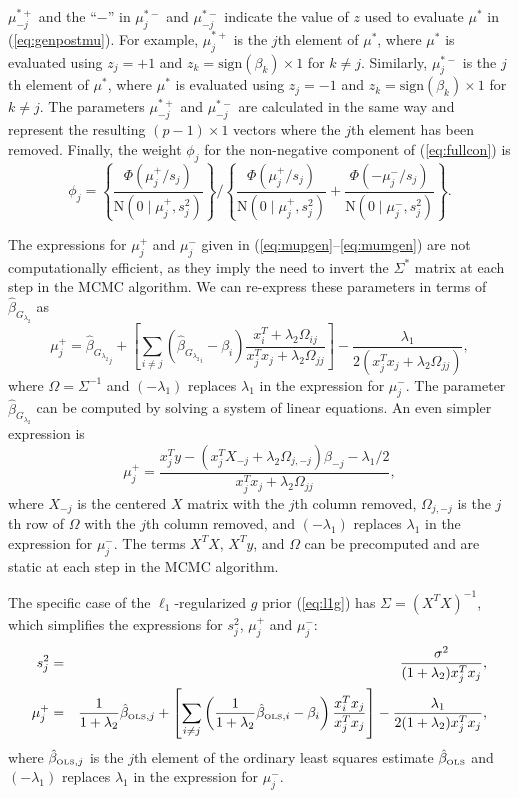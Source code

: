\documentclass[12pt]{article}
\begin{document}
$\mu^{*+}_{-j}$ and the ``$-$'' in $\mu^{*-}_j$ and $\mu^{*-}_{-j}$ indicate the value of $z$ used to evaluate
$\mu^*$ in (\ref{eq:genpostmu}).  For example, $\mu^{*+}_j$ is the $j$th element of $\mu^*$, where $\mu^*$
is evaluated using $z_j = +1$ and $z_k = \mbox{sign}(\beta_k)\times 1$ for $k \neq j$.   Similarly,
$\mu^{*-}_j$ is the $j$th element of $\mu^*$, where $\mu^*$ is evaluated using $z_j = -1$ and 
$z_k = \mbox{sign}(\beta_k)\times 1$ for $k \neq j$.  The parameters $\mu^{*+}_{-j}$ and $\mu^{*-}_{-j}$ are 
calculated in the
same way and represent the resulting $(p-1)\times 1$ vectors where the $j$th element has been removed.
Finally, the weight $\phi_j$ for the non-negative component of (\ref{eq:fullcon}) is
\[
	\phi_j = \left\{ \frac{\Phi(\mu^+_j/s_j)}{\mbox{N}(0 \mid \mu^+_j, s^2_j)}\right\}
	\Big/\left\{ \frac{\Phi(\mu^+_j/s_j)}{\mbox{N}(0 \mid \mu^+_j, s^2_j)}
	+ \frac{\Phi(-\mu^-_j/s_j)}{\mbox{N}(0 \mid \mu^-_j, s^2_j)}
	\right\}.
\]

The expressions for $\mu^+_j$ and $\mu^-_j$ given in (\ref{eq:mupgen}--\ref{eq:mumgen}) are not 
computationally efficient, as they imply the need to invert the $\Sigma^*$ matrix at each step in the 
MCMC algorithm. We can re-express these parameters in terms of $\hat{\beta}_{G_{\lambda_2}}$ as
\[
	\mu_j^+ = \hat{\beta}_{{G_{\lambda_2}}_j} + 
		\left[ \sum_{i\neq j} \left(\hat{\beta}_{{G_{\lambda_2}}_i} - \beta_i \right)
		\frac{x_i^T   + \lambda_2 \Omega_{ij}}{x_j^T x_j + \lambda_2 \Omega_{jj}}
		\right]  - \frac{\lambda_1}{2(x_j^T x_j + \lambda_2 \Omega_{jj})},
\]
where $\Omega = \Sigma^{-1}$ and $(-\lambda_1)$ replaces $\lambda_1$ in the expression for
$\mu_j^-$. The parameter $\hat{\beta}_{G_{\lambda_2}}$ can be computed
by solving a system of linear equations. An even simpler expression is
\begin{equation}
	\mu_j^+ = \frac{x_j^T y - (x_j^T X_{-j} + \lambda_2 \Omega_{j,-j})\beta_{-j} - 
		\lambda_1/2}{x_j^T x_j + \lambda_2 \Omega_{jj}},
		\label{eq:mujcomp}
\end{equation}
where $X_{-j}$ is the centered $X$ matrix with the $j$th column removed, $\Omega_{j,-j}$ is the 
$j$th row of $\Omega$ with the $j$th column removed, and $(-\lambda_1)$ replaces $\lambda_1$ in the
expression for $\mu_j^-$. The terms $X^T X$, $X^T y$, and $\Omega$ can
be precomputed and are static at each step in the MCMC algorithm.

The specific case of the $\ell_1$-regularized $g$ prior (\ref{eq:l1g}) has $\Sigma = (X^TX)^{-1}$, 
which simplifies the expressions for $s^2_j$, $\mu^+_j$ and $\mu^-_j$:
\begin{eqnarray*}
	s^2_j &=& \frac{\sigma^2}{(1 + \lambda_2)x_j^T x_j}, \\
	\mu^+_j &=& \frac{1}{1+\lambda_2}\hat{\beta}_{\mbox{\tiny OLS}, j}
	+ \left[ \sum_{i \neq j}\left(\frac{1}{1+\lambda_2}\hat{\beta}_{\mbox{\tiny OLS}, i}
		- \beta_i\right)\frac{x_i^Tx_j}{x_j^Tx_j}\right] - \frac{\lambda_1}{2(1+\lambda_2)x_j^T x_j},
\end{eqnarray*}
where $\hat{\beta}_{\mbox{\tiny OLS}, j}$
is the $j$th element of the ordinary least squares estimate $\hat{\beta}_{\mbox{\tiny OLS}}$ and $(-\lambda_1)$ replaces
$\lambda_1$ in the expression for $\mu_j^-$.
\end{document}
